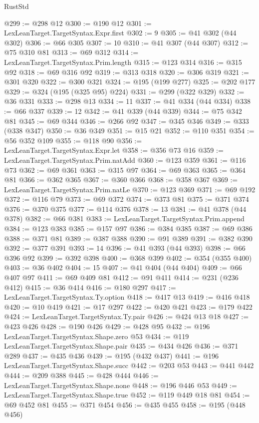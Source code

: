 \begin{lexlean}{RustStd}
\begin{coremodule}
@299 := @298 @12
@300 := @190 @12
@301 := LexLeanTarget.TargetSyntax.Expr.first
@302 := 9
@305 := @41 @302 (@44 @302)
@306 := @66 @305
@307 := 10
@310 := @41 @307 (@44 @307)
@312 := @75 @310 @81
@313 := @69 @312
@314 := LexLeanTarget.TargetSyntax.Prim.length
@315 := @123 @314
@316 := @315 @92
@318 := @69 @316 @92
@319 := @313 @318
@320 := @306 @319
@321 := @301 @320
@322 := @300 @321
@324 := @195 (@199 @277)
@325 := @202 @177
@329 := @324 (@195 (@325 @95) @224)
@331 := @299 (@322 @329)
@332 := @36 @331
@333 := @298 @13
@334 := 11
@337 := @41 @334 (@44 @334)
@338 := @66 @337
@339 := 12
@342 := @41 @339 (@44 @339)
@344 := @75 @342 @81
@345 := @69 @344
@346 := @266 @92
@347 := @345 @346
@349 := @333 (@338 @347)
@350 := @36 @349
@351 := @15 @21
@352 := @110 @351
@354 := @56 @352 @109
@355 := @118 @90
@356 := LexLeanTarget.TargetSyntax.Expr.let
@358 := @356 @73 @16
@359 := LexLeanTarget.TargetSyntax.Prim.natAdd
@360 := @123 @359
@361 := @116 @73
@362 := @69 @361
@363 := @315 @97
@364 := @69 @363
@365 := @364 @81
@366 := @362 @365
@367 := @360 @366
@368 := @358 @367
@369 := LexLeanTarget.TargetSyntax.Prim.natLe
@370 := @123 @369
@371 := @69 @192
@372 := @116 @79
@373 := @69 @372
@374 := @373 @81
@375 := @371 @374
@376 := @370 @375
@377 := @114 @376
@378 := 13
@381 := @41 @378 (@44 @378)
@382 := @66 @381
@383 := LexLeanTarget.TargetSyntax.Prim.append
@384 := @123 @383
@385 := @157 @97
@386 := @384 @385
@387 := @69 @386
@388 := @371 @81
@389 := @387 @388
@390 := @91 @389
@391 := @382 @390
@392 := @377 @391
@393 := 14
@396 := @41 @393 (@44 @393)
@398 := @66 @396 @92
@399 := @392 @398
@400 := @368 @399
@402 := @354 (@355 @400)
@403 := @36 @402
@404 := 15
@407 := @41 @404 (@44 @404)
@409 := @66 @407 @97
@411 := @69 @409 @81
@412 := @91 @411
@414 := @231 (@236 @412)
@415 := @36 @414
@416 := @180 @297
@417 := LexLeanTarget.TargetSyntax.Ty.option
@418 := @417 @13
@419 := @416 @418
@420 := @10 @419
@421 := @17 @297
@422 := @420 @421
@423 := @179 @422
@424 := LexLeanTarget.TargetSyntax.Ty.pair
@426 := @424 @13 @18
@427 := @423 @426
@428 := @190 @426
@429 := @428 @95
@432 := @196 LexLeanTarget.TargetSyntax.Shape.zero @53
@434 := @119 LexLeanTarget.TargetSyntax.Shape.pair
@435 := @434 @426
@436 := @371 @289
@437 := @435 @436
@439 := @195 (@432 @437)
@441 := @196 LexLeanTarget.TargetSyntax.Shape.succ
@442 := @203 @53
@443 := @441 @442
@444 := @209 @388
@445 := @428 @444
@446 := LexLeanTarget.TargetSyntax.Shape.none
@448 := @196 @446 @53
@449 := LexLeanTarget.TargetSyntax.Shape.true
@452 := @119 @449 @18 @81
@454 := @69 @452 @81
@455 := @371 @454
@456 := @435 @455
@458 := @195 (@448 @456)

\end{coremodule}
\end{lexlean}
